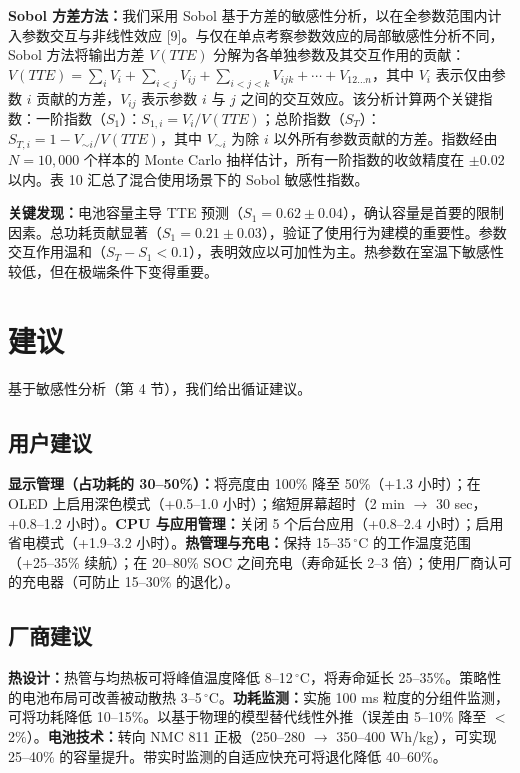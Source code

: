 \documentclass[11pt,a4paper]{ctexart}
\begin{document}
\textbf{Sobol 方差方法：}我们采用 Sobol 基于方差的敏感性分析，以在全参数范围内计入参数交互与非线性效应 [9]。与仅在单点考察参数效应的局部敏感性分析不同，Sobol 方法将输出方差 $V(TTE)$ 分解为各单独参数及其交互作用的贡献：$V(TTE) = \sum_i V_i + \sum_{i<j}V_{ij} + \sum_{i<j<k}V_{ijk} + \cdots + V_{12\ldots n}$，其中 $V_i$ 表示仅由参数 $i$ 贡献的方差，$V_{ij}$ 表示参数 $i$ 与 $j$ 之间的交互效应。该分析计算两个关键指数：一阶指数（$S_1$）：$S_{1,i} = V_i/V(TTE)$；总阶指数（$S_T$）：$S_{T,i} = 1 - V_{\sim i}/V(TTE)$，其中 $V_{\sim i}$ 为除 $i$ 以外所有参数贡献的方差。指数经由 $N = 10{,}000$ 个样本的 Monte Carlo 抽样估计，所有一阶指数的收敛精度在 $\pm 0.02$ 以内。表 10 汇总了混合使用场景下的 Sobol 敏感性指数。

\textbf{关键发现：}电池容量主导 TTE 预测（$S_1 = 0.62 \pm 0.04$），确认容量是首要的限制因素。总功耗贡献显著（$S_1 = 0.21 \pm 0.03$），验证了使用行为建模的重要性。参数交互作用温和（$S_T - S_1 < 0.1$），表明效应以可加性为主。热参数在室温下敏感性较低，但在极端条件下变得重要。

\section{建议}

基于敏感性分析（第 4 节），我们给出循证建议。

\subsection{用户建议}

\textbf{显示管理（占功耗的 30--50\%）：}将亮度由 100\% 降至 50\%（+1.3 小时）；在 OLED 上启用深色模式（+0.5--1.0 小时）；缩短屏幕超时（2 min $\rightarrow$ 30 sec，+0.8--1.2 小时）。\textbf{CPU 与应用管理：}关闭 5 个后台应用（+0.8--2.4 小时）；启用省电模式（+1.9--3.2 小时）。\textbf{热管理与充电：}保持 15--35\,$^{\circ}$C 的工作温度范围（+25--35\% 续航）；在 20--80\% SOC 之间充电（寿命延长 2--3 倍）；使用厂商认可的充电器（可防止 15--30\% 的退化）。

\subsection{厂商建议}

\textbf{热设计：}热管与均热板可将峰值温度降低 8--12\,$^{\circ}$C，将寿命延长 25--35\%。策略性的电池布局可改善被动散热 3--5\,$^{\circ}$C。\textbf{功耗监测：}实施 100 ms 粒度的分组件监测，可将功耗降低 10--15\%。以基于物理的模型替代线性外推（误差由 5--10\% 降至 $<$ 2\%）。\textbf{电池技术：}转向 NMC 811 正极（250--280 $\rightarrow$ 350--400 Wh/kg），可实现 25--40\% 的容量提升。带实时监测的自适应快充可将退化降低 40--60\%。
\end{document}

